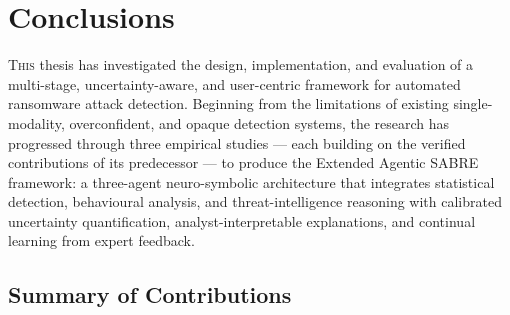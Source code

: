 
\chapter{Conclusions}
\label{chap:conclusions}

\lettrine{T}{his} thesis has investigated the design, implementation, and evaluation of
a multi-stage, uncertainty-aware, and user-centric framework for automated ransomware
attack detection.
Beginning from the limitations of existing single-modality, overconfident, and opaque
detection systems, the research has progressed through three empirical studies — each
building on the verified contributions of its predecessor — to produce the Extended
Agentic SABRE framework: a three-agent neuro-symbolic architecture that integrates
statistical detection, behavioural analysis, and threat-intelligence reasoning with
calibrated uncertainty quantification, analyst-interpretable explanations, and
continual learning from expert feedback.

\section{Summary of Contributions}
\label{sec:conc_contributions}

%
%
%

